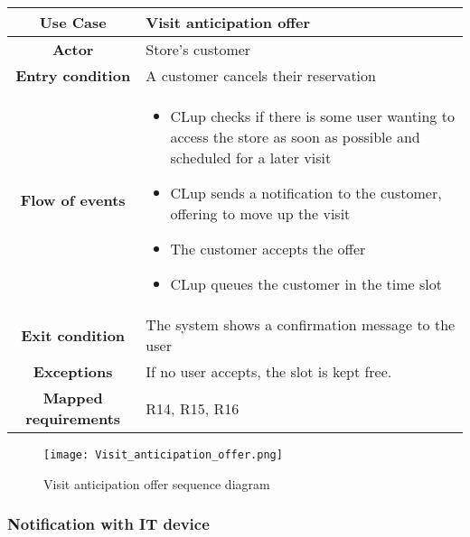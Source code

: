 \documentclass[../../main.tex]{subfiles}
\begin{document}
      \begin{table}[H]
        \centering
          \begin{tabular}{c m{}}
          \hline
          \textbf{Use Case} & Visit anticipation offer\\ \hline
          \textbf{Actor} & Store's customer\\ \hline
          \textbf{Entry condition} & A customer cancels their reservation\\  \hline
          \textbf{Flow of events} & \begin{itemize}
                                      \item CLup checks if there is some user wanting to access the store as soon as possible and scheduled for a later visit
                                      \item CLup sends a notification to the customer, offering to move up the visit
                                      \item The customer accepts the offer
                                      \item CLup queues the customer in the time slot
                                    \end{itemize}\\ \hline
          \textbf{Exit condition} & The system shows a confirmation message to the user \\ \hline
          \textbf{Exceptions} & If no user accepts, the slot is kept free. \\ \hline
          \textbf{Mapped requirements} & R14, R15, R16\\ \hline
          \end{tabular}
      \end{table}

      \begin{figure}[H]
        \centering
        \texttt{[image: Visit\_anticipation\_offer.png]}
        \caption{Visit anticipation offer sequence diagram}
      \end{figure}


      \subsubsection{Notification with IT device}
\end{document}
